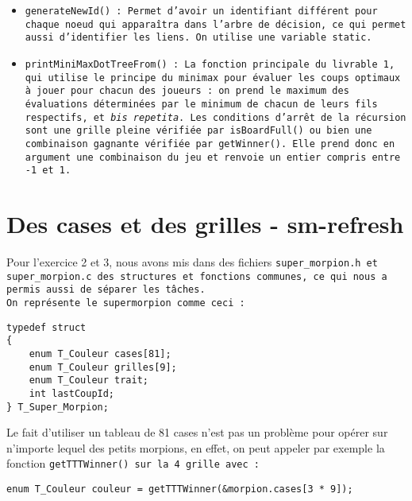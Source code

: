 \documentclass[14pt,a4paper]{article}
\begin{document}
\begin{itemize}[label=-]
\item\tt{generateNewId()} : Permet d'avoir un identifiant différent pour chaque noeud qui apparaîtra dans l'arbre de décision, ce qui permet aussi d'identifier les liens. On utilise une variable \tt{static}.\\

\item\tt{printMiniMaxDotTreeFrom()} : La  fonction principale du livrable 1, qui utilise le principe du minimax pour évaluer les coups optimaux à jouer pour chacun des joueurs : on prend le maximum des évaluations déterminées par le minimum de chacun de leurs fils respectifs, et \emph{bis repetita}. Les conditions d'arrêt de la récursion sont une grille pleine vérifiée par \tt{isBoardFull()} ou bien une combinaison gagnante vérifiée par \tt{getWinner()}. Elle prend donc en argument une combinaison du jeu et renvoie un entier compris entre -1 et 1.

\end{itemize}

\section{Des cases et des grilles - sm-refresh}

Pour l'exercice 2 et 3, nous avons mis dans des fichiers \tt{super\_morpion.h} et \tt{super\_morpion.c} des structures et fonctions communes, ce qui nous a permis aussi de séparer les tâches.\\

On représente le supermorpion comme ceci : 

\begin{lstlisting}
typedef struct
{
    enum T_Couleur cases[81];
    enum T_Couleur grilles[9];
    enum T_Couleur trait;
    int lastCoupId;
} T_Super_Morpion;
\end{lstlisting} 

Le fait d'utiliser un tableau de 81 cases n'est pas un problème pour opérer sur n'importe lequel des petits morpions, en effet, on peut appeler par exemple la fonction \tt{getTTTWinner()} sur la 4\ieme\ grille avec :
\begin{center}
    \tt{enum T\_Couleur couleur = getTTTWinner(\&morpion.cases[3 * 9]);}\\
\end{center}
\end{document}
